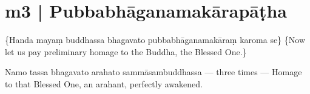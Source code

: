 \section*{m3 | Pubbabhāganamakārapāṭha}\label{sec:m03}

\begin{chantsubsection}
  \chantnote
    {\{Handa mayaṃ buddhassa bhagavato
     pubbabhāganamakāraṃ karoma se\}}
  \chantnotetrans
    {\{Now let us pay preliminary homage to the Buddha, the Blessed One.\}}

  \chantnote
    {Namo tassa bhagavato arahato sammāsambuddhassa}
  \chantnote
    {--- three times ---}
  \chantgap
  \chantnotetrans
    {Homage to that Blessed One, an arahant, perfectly awakened.}
\end{chantsubsection}
